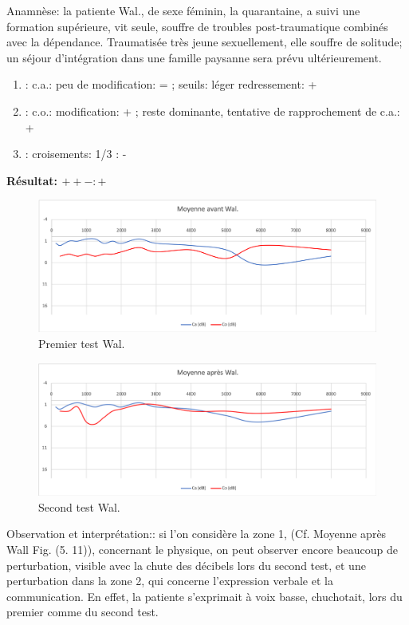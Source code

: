Anamnèse: la patiente Wal., de sexe féminin, la quarantaine, a suivi une formation supérieure, vit seule,  
souffre de troubles post-traumatique combinés avec la dépendance. Traumatisée très jeune 
sexuellement, elle souffre de solitude;  un séjour d'intégration dans une famille paysanne sera prévu 
ultérieurement.
	\begin{enumerate}

 		\item : c.a.: peu de modification: = ;  seuils: léger redressement: +

 		\item : c.o.:  modification:  + ; reste dominante, tentative de rapprochement de c.a.: +
 		\item : croisements: 1/3 :  -

                \end{enumerate}

                \textbf{ Résultat:  $ + +  -        : +$ }
\begin{figure}[th]
	\centering
	\includegraphics[width=0.7\linewidth]{images/graphiques/wal_pre.png}
	\caption[Patient Wal. :1° test]{Premier test Wal.}
	
\end{figure}
               \begin{figure}%
\centering
\includegraphics[width=0.7\linewidth]{images/graphiques/wal_post.png}
\caption[Patient Wal. : 2° test]{Second test Wal.}

\label{groupecontroleimage1}
\end{figure}


Observation et interprétation:: si l'on considère la zone 1, (Cf. Moyenne après Wall Fig. (5. 11)),  
concernant 
le 
physique, on 
peut observer 
encore beaucoup de 
perturbation, visible avec la chute des décibels lors du second test,  et une perturbation dans la zone 2, 
qui concerne l'expression verbale et la communication. En effet, la patiente s'exprimait  à voix basse, 
chuchotait, lors du premier comme du second test.



